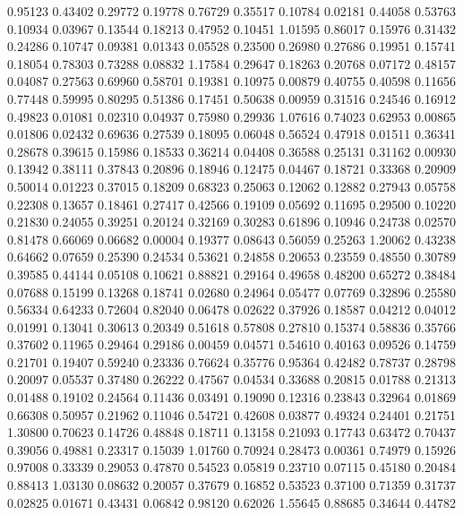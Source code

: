   0.95123 0.43402
  0.29772 0.19778
  0.76729 0.35517
  0.10784 0.02181
  0.44058 0.53763
  0.10934 0.03967
  0.13544 0.18213
  0.47952 0.10451
  1.01595 0.86017
  0.15976 0.31432
  0.24286 0.10747
  0.09381 0.01343
  0.05528 0.23500
  0.26980 0.27686
  0.19951 0.15741
  0.18054 0.78303
  0.73288 0.08832
  1.17584 0.29647
  0.18263 0.20768
  0.07172 0.48157
  0.04087 0.27563
  0.69960 0.58701
  0.19381 0.10975
  0.00879 0.40755
  0.40598 0.11656
  0.77448 0.59995
  0.80295 0.51386
  0.17451 0.50638
  0.00959 0.31516
  0.24546 0.16912
  0.49823 0.01081
  0.02310 0.04937
  0.75980 0.29936
  1.07616 0.74023
  0.62953 0.00865
  0.01806 0.02432
  0.69636 0.27539
  0.18095 0.06048
  0.56524 0.47918
  0.01511 0.36341
  0.28678 0.39615
  0.15986 0.18533
  0.36214 0.04408
  0.36588 0.25131
  0.31162 0.00930
  0.13942 0.38111
  0.37843 0.20896
  0.18946 0.12475
  0.04467 0.18721
  0.33368 0.20909
  0.50014 0.01223
  0.37015 0.18209
  0.68323 0.25063
  0.12062 0.12882
  0.27943 0.05758
  0.22308 0.13657
  0.18461 0.27417
  0.42566 0.19109
  0.05692 0.11695
  0.29500 0.10220
  0.21830 0.24055
  0.39251 0.20124
  0.32169 0.30283
  0.61896 0.10946
  0.24738 0.02570
  0.81478 0.66069
  0.06682 0.00004
  0.19377 0.08643
  0.56059 0.25263
  1.20062 0.43238
  0.64662 0.07659
  0.25390 0.24534
  0.53621 0.24858
  0.20653 0.23559
  0.48550 0.30789
  0.39585 0.44144
  0.05108 0.10621
  0.88821 0.29164
  0.49658 0.48200
  0.65272 0.38484
  0.07688 0.15199
  0.13268 0.18741
  0.02680 0.24964
  0.05477 0.07769
  0.32896 0.25580
  0.56334 0.64233
  0.72604 0.82040
  0.06478 0.02622
  0.37926 0.18587
  0.04212 0.04012
  0.01991 0.13041
  0.30613 0.20349
  0.51618 0.57808
  0.27810 0.15374
  0.58836 0.35766
  0.37602 0.11965
  0.29464 0.29186
  0.00459 0.04571
  0.54610 0.40163
  0.09526 0.14759
  0.21701 0.19407
  0.59240 0.23336
  0.76624 0.35776
  0.95364 0.42482
  0.78737 0.28798
  0.20097 0.05537
  0.37480 0.26222
  0.47567 0.04534
  0.33688 0.20815
  0.01788 0.21313
  0.01488 0.19102
  0.24564 0.11436
  0.03491 0.19090
  0.12316 0.23843
  0.32964 0.01869
  0.66308 0.50957
  0.21962 0.11046
  0.54721 0.42608
  0.03877 0.49324
  0.24401 0.21751
  1.30800 0.70623
  0.14726 0.48848
  0.18711 0.13158
  0.21093 0.17743
  0.63472 0.70437
  0.39056 0.49881
  0.23317 0.15039
  1.01760 0.70924
  0.28473 0.00361
  0.74979 0.15926
  0.97008 0.33339
  0.29053 0.47870
  0.54523 0.05819
  0.23710 0.07115
  0.45180 0.20484
  0.88413 1.03130
  0.08632 0.20057
  0.37679 0.16852
  0.53523 0.37100
  0.71359 0.31737
  0.02825 0.01671
  0.43431 0.06842
  0.98120 0.62026
  1.55645 0.88685
  0.34644 0.44782

